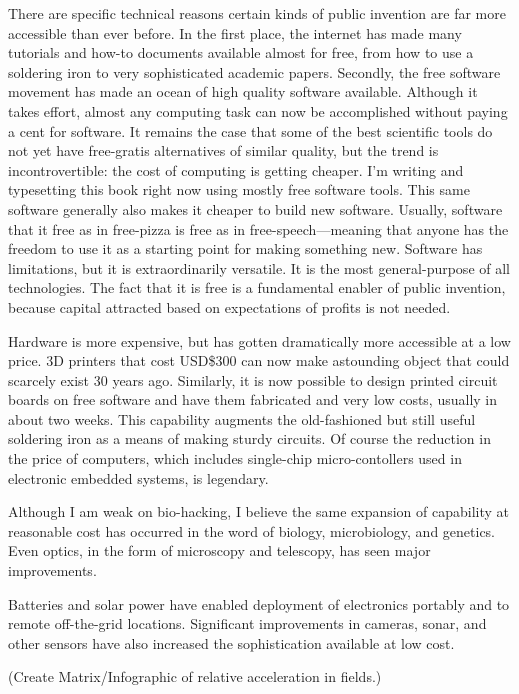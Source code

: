 \documentclass[
	fontsize=10pt, %
	twoside=false, %
	secnumdepth=1, %
]{kaobook}
\begin{document}
There are specific technical reasons certain kinds of
public invention are far more accessible than ever before.
In the first place, the internet has made many tutorials
and how-to documents available almost for free, from
how to use a soldering iron to very sophisticated academic
papers.
Secondly, the free software movement has made an ocean
of high quality software available.
Although it takes effort, almost any computing task can
now be accomplished without paying a cent for software.
It remains the case that some of the best scientific tools
do not yet have free-gratis alternatives of similar quality,
but the trend is incontrovertible: the cost of computing
is getting cheaper.
I'm writing and typesetting this book right now
using mostly free software tools.
This same software generally also makes it cheaper to
build new software.
Usually, software that it free
as in free-pizza is free as in free-speech---meaning that
anyone has the freedom to use it as a starting point for making
something new.
Software has limitations, but it is extraordinarily versatile.
It is the most general-purpose of all technologies. The fact
that it is free is a fundamental enabler of public invention,
because capital attracted based on expectations of profits is
not needed.

Hardware is more expensive, but has gotten dramatically
more accessible at a low price. 3D printers that cost USD\$300
can now make astounding object that could scarcely exist 30
years ago. Similarly, it is now possible to design printed
circuit boards on free software and have them fabricated
and very low costs, usually in about two weeks.
This capability augments the old-fashioned but still
useful soldering iron as a means of making sturdy circuits.
Of course the reduction in the price of computers, which
includes single-chip micro-contollers used in electronic
embedded systems, is legendary.

Although I am weak on bio-hacking, I believe the same
expansion of capability at reasonable cost has occurred in
the word of biology, microbiology, and genetics.
Even optics, in the form of microscopy and telescopy,
has seen major improvements.

Batteries and solar power have enabled deployment of
electronics portably and to remote off-the-grid locations.
Significant improvements in cameras, sonar, and other
sensors have also increased the sophistication available
at low cost.

(Create Matrix/Infographic of relative acceleration in fields.)
\end{document}
